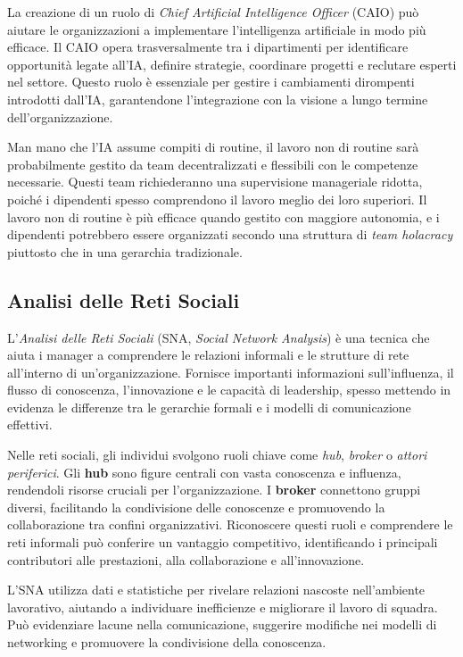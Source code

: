 \documentclass{article}
\begin{document}
La creazione di un ruolo di \textit{Chief Artificial Intelligence Officer} (CAIO) può aiutare le organizzazioni a implementare l'intelligenza artificiale in modo più efficace. Il CAIO opera trasversalmente tra i dipartimenti per identificare opportunità legate all'IA, definire strategie, coordinare progetti e reclutare esperti nel settore. Questo ruolo è essenziale per gestire i cambiamenti dirompenti introdotti dall'IA, garantendone l'integrazione con la visione a lungo termine dell'organizzazione.

Man mano che l'IA assume compiti di routine, il lavoro non di routine sarà probabilmente gestito da team decentralizzati e flessibili con le competenze necessarie. Questi team richiederanno una supervisione manageriale ridotta, poiché i dipendenti spesso comprendono il lavoro meglio dei loro superiori. Il lavoro non di routine è più efficace quando gestito con maggiore autonomia, e i dipendenti potrebbero essere organizzati secondo una struttura di \textit{team holacracy} piuttosto che in una gerarchia tradizionale.

\subsection{Analisi delle Reti Sociali}

L'\textit{Analisi delle Reti Sociali} (SNA, \textit{Social Network Analysis}) è una tecnica che aiuta i manager a comprendere le relazioni informali e le strutture di rete all'interno di un'organizzazione. Fornisce importanti informazioni sull'influenza, il flusso di conoscenza, l'innovazione e le capacità di leadership, spesso mettendo in evidenza le differenze tra le gerarchie formali e i modelli di comunicazione effettivi.

Nelle reti sociali, gli individui svolgono ruoli chiave come \textit{hub}, \textit{broker} o \textit{attori periferici}. Gli \textbf{hub} sono figure centrali con vasta conoscenza e influenza, rendendoli risorse cruciali per l'organizzazione. I \textbf{broker} connettono gruppi diversi, facilitando la condivisione delle conoscenze e promuovendo la collaborazione tra confini organizzativi. Riconoscere questi ruoli e comprendere le reti informali può conferire un vantaggio competitivo, identificando i principali contributori alle prestazioni, alla collaborazione e all'innovazione.

L'SNA utilizza dati e statistiche per rivelare relazioni nascoste nell'ambiente lavorativo, aiutando a individuare inefficienze e migliorare il lavoro di squadra. Può evidenziare lacune nella comunicazione, suggerire modifiche nei modelli di networking e promuovere la condivisione della conoscenza.
\end{document}
